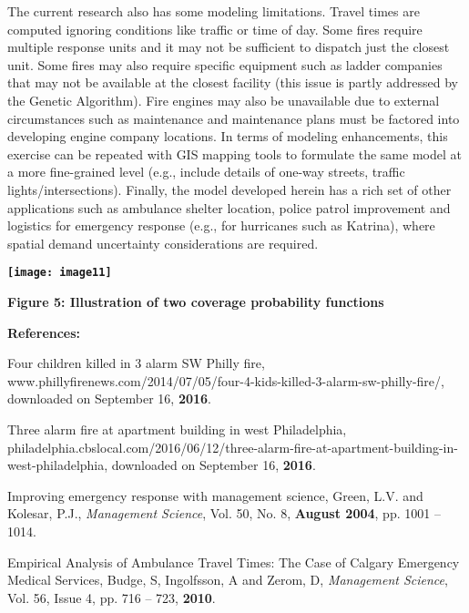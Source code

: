 \documentclass{article} %
\begin{document}
\noindent 

\noindent The current research also has some modeling limitations.  Travel times are computed ignoring conditions like traffic or time of day.  Some fires require multiple response units and it may not be sufficient to dispatch just the closest unit.   Some fires may also require specific equipment such as ladder companies that may not be available at the closest facility (this issue is partly addressed by the Genetic Algorithm).\textbf{  }Fire engines may also be unavailable due to external circumstances such as maintenance and maintenance plans must be factored into developing engine company locations.\textbf{  }In terms of modeling enhancements, this exercise can be repeated with GIS mapping tools to formulate the same model at a more fine-grained level (e.g., include details of one-way streets, traffic lights/intersections).  Finally, the model developed herein has a rich set of other applications such as ambulance shelter location, police patrol improvement and logistics for emergency response (e.g., for hurricanes such as Katrina), where spatial demand uncertainty considerations are required.\textbf{}

\noindent \textbf{\eject }

\noindent \textbf{}

\noindent \textbf{\texttt{[image: image11]}}

\noindent \textbf{Figure 5:  Illustration of two coverage probability functions}

\noindent \textbf{References:}

\noindent [1] Four children killed in 3 alarm SW Philly fire, www.phillyfirenews.com/2014/07/05/four-4-kids-killed-3-alarm-sw-philly-fire/, downloaded on September 16, \textbf{2016}.

\noindent 

\noindent [2] Three alarm fire at apartment building in west Philadelphia, philadelphia.cbslocal.com/2016/06/12/three-alarm-fire-at-apartment-building-in-west-philadelphia, downloaded on September 16, \textbf{2016}.

\noindent 

\noindent [3] Improving emergency response with management science, Green, L.V. and Kolesar, P.J., \textit{Management Science}, Vol. 50, No. 8, \textbf{August 2004}, pp. 1001 -- 1014.

\noindent 

\noindent [4] Empirical Analysis of Ambulance Travel Times: The Case of Calgary Emergency Medical Services, Budge, S,  Ingolfsson, A and Zerom, D, \textit{Management Science}, Vol. 56, Issue 4, pp. 716 -- 723, \textbf{2010}.
\end{document}
